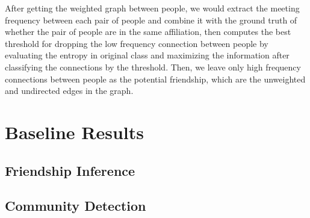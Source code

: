 \documentclass[11pt]{article}
\begin{document}
After getting the weighted graph between people, we would extract the meeting frequency between each pair of people and combine it with the ground truth of whether the pair of people are in the same affiliation, then computes the best threshold for dropping the low frequency connection between people by evaluating the entropy in original class and maximizing the information after classifying the connections by the threshold. Then, we leave only high frequency connections between people as the potential friendship, which are the unweighted and undirected edges in the graph.

\section{Baseline Results}
\subsection{Friendship Inference}

\subsection{Community Detection}




%

\end{document}
